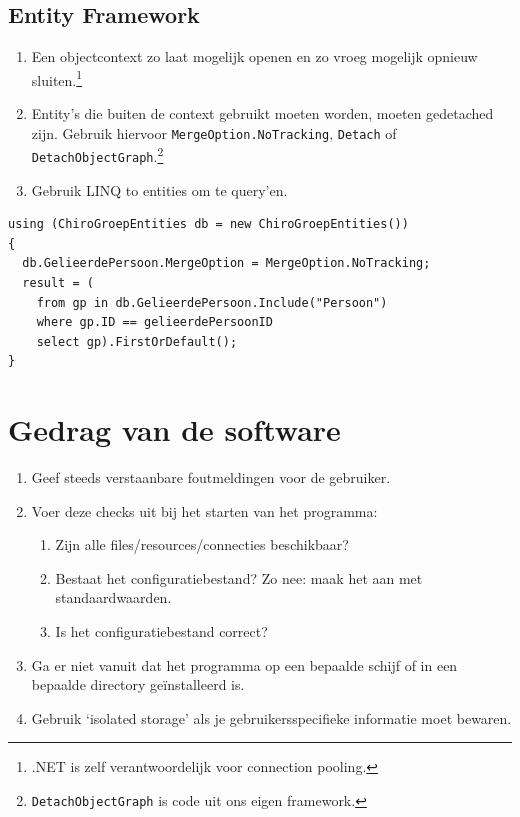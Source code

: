 \documentclass[a4paper,11pt]{article}
\begin{document}
\subsection{Entity Framework}
\begin{enumerate}[resume]
\item Een objectcontext zo laat mogelijk openen en zo vroeg mogelijk opnieuw sluiten.\footnote{.NET is
zelf verantwoordelijk voor connection pooling.}
\item Entity's die buiten de context gebruikt moeten worden, moeten
gedetached zijn.  Gebruik hiervoor \lstinline !MergeOption.NoTracking!,
\lstinline !Detach! of \lstinline !DetachObjectGraph!.\footnote{\lstinline !DetachObjectGraph! is code uit ons eigen framework.}
\item Gebruik LINQ to entities om te query'en.
\end{enumerate}

\begin{lstlisting}[float, caption=Entity Framework]
using (ChiroGroepEntities db = new ChiroGroepEntities())
{
  db.GelieerdePersoon.MergeOption = MergeOption.NoTracking;
  result = (
    from gp in db.GelieerdePersoon.Include("Persoon")
    where gp.ID == gelieerdePersoonID
    select gp).FirstOrDefault();
}
\end{lstlisting}

\section{Gedrag van de software}
\begin{enumerate}[resume]
\item Geef steeds verstaanbare foutmeldingen voor de gebruiker.
\item Voer deze checks uit bij het starten van het programma:
\begin{enumerate}
\item Zijn alle files/resources/connecties beschikbaar?
\item Bestaat het configuratiebestand? Zo nee: maak het aan met standaardwaarden.
\item Is het configuratiebestand correct?
\end{enumerate}
\item Ga er niet vanuit dat het programma op een bepaalde schijf of in een bepaalde directory
ge\"installeerd is.
\item Gebruik `isolated storage' als je gebruikersspecifieke informatie moet bewaren.
\end{enumerate}
\end{document}
